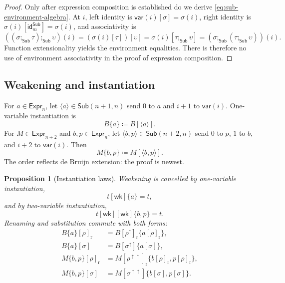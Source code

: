 \documentclass[10pt,reqno]{amsart}
\newtheorem{proposition}[theorem]{Proposition}
\newcommand{\Expr}{\mathsf{Expr}}
\newcommand{\Sub}{\mathsf{Sub}}
\newcommand{\Var}{\mathsf{var}}
\newcommand{\idren}{\mathsf{id}}
\newcommand{\wk}{\mathsf{wk}}
\newcommand{\lift}{\uparrow}
\begin{document}
\begin{proof}
Only after expression composition is established do we derive
\eqref{eq:sub-environment-algebra}.  At \(i\), left identity is
\(\Var(i)[\sigma]=\sigma(i)\), right identity is
\(\sigma(i)[\idren^{\Sub}_m]=\sigma(i)\), and associativity is
\[
 ((\sigma;_{\Sub}\tau);_{\Sub}\upsilon)(i)
 =(\sigma(i)[\tau])[\upsilon]
 =\sigma(i)[\tau;_{\Sub}\upsilon]
 =(\sigma;_{\Sub}(\tau;_{\Sub}\upsilon))(i).
\]
Function extensionality yields the environment equalities.  There is
therefore no use of environment associativity in the proof of expression
composition.
\end{proof}

\subsection{Weakening and instantiation}

For \(a\in\Expr_n\), let
\(\langle a\rangle\in\Sub(n+1,n)\) send \(0\) to \(a\) and \(i+1\) to
\(\Var(i)\).  One-variable instantiation is
\[
                     B\{a\}\coloneqq B[\langle a\rangle].
\]
For \(M\in\Expr_{n+2}\) and \(b,p\in\Expr_n\), let
\(\langle b,p\rangle\in\Sub(n+2,n)\) send \(0\) to \(p\), \(1\) to \(b\),
and \(i+2\) to \(\Var(i)\).  Then
\[
                     M\{b,p\}\coloneqq M[\langle b,p\rangle].
\]
The order reflects de Bruijn extension: the proof is newest.

\begin{proposition}[Instantiation laws]
\label{prop:instantiation}
Weakening is cancelled by one-variable instantiation,
\[
                   t[\wk]\{a\}=t,
\]
and by two-variable instantiation,
\[
              t[\wk][\wk]\{b,p\}=t.
\]
Renaming and substitution commute with both forms:
\[
\begin{aligned}
B\{a\}[\rho]_{\mathrm r}
 &=B[\rho^\lift]_{\mathrm r}\{a[\rho]_{\mathrm r}\},\\
B\{a\}[\sigma]
 &=B[\sigma^\lift]\{a[\sigma]\},\\
M\{b,p\}[\rho]_{\mathrm r}
 &=M[\rho^{\lift\lift}]_{\mathrm r}
       \{b[\rho]_{\mathrm r},p[\rho]_{\mathrm r}\},\\
M\{b,p\}[\sigma]
 &=M[\sigma^{\lift\lift}]\{b[\sigma],p[\sigma]\}.
\end{aligned}
\tag{4.12}\label{eq:instantiation-laws}
\]
\end{proposition}
\end{document}
